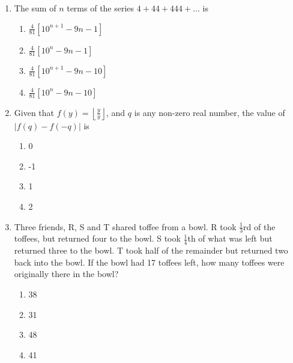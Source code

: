 \documentclass[journal,12pt,onecolumn]{IEEEtran}
\theoremstyle{remark}
\begin{document}
\begin{enumerate}
\item    \hspace{0.5cm} The sum of $n$ terms of the series $4+44+444+\ldots$ is  \hfill{}

\begin{multicols}{2}
\begin{enumerate}
    \item $\frac{4}{81} \left[10^{n+1} - 9n - 1 \right]$
    \item $\frac{4}{81} \left[10^{n} - 9n - 1 \right]$
    \item $\frac{4}{81} \left[10^{n+1} - 9n - 10 \right]$
    \item $\frac{4}{81} \left[10^n - 9n - 10 \right]$
\end{enumerate}
\end{multicols}

 

\item    \hspace{0.5cm} Given that $f(y) = \left\lfloor \frac{y}{y} \right\rfloor$, and $q$ is any non-zero real number, the value of $|f(q) - f(-q)|$ is  \hfill{}

\begin{multicols}{2}
\begin{enumerate}
    \item 0
    \item -1
    \item 1
    \item 2
\end{enumerate}
\end{multicols}

 

\item    \hspace{0.5cm} Three friends, R, S and T shared toffee from a bowl. R took $\frac{1}{3}$rd of the toffees, but returned four to the bowl. S took $\frac{1}{4}$th of what was left but returned three to the bowl. T took half of the remainder but returned two back into the bowl. If the bowl had 17 toffees left, how many toffees were originally there in the bowl?  \hfill{}

\begin{multicols}{2}
\begin{enumerate}
    \item 38
    \item 31
    \item 48
    \item 41
\end{enumerate}
\end{multicols}


\end{enumerate}
\end{document}
